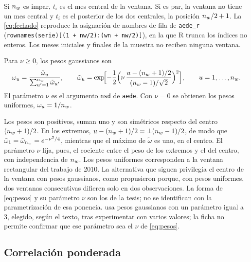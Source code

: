 Si $n_{w}$ es impar, $t_i$ es el mes central de la ventana. Si es par, la ventana no tiene un mes
central y $t_i$ es el posterior de los dos centrales, la posición $n_{w}/2+1$. La
\cref{eq:fechado} reproduce la asignación de nombres de fila de \texttt{aede\_r}
(\texttt{rownames(serie)[(1 + nw/2):(wn + nw/2)]}), en la que R trunca los índices no enteros.
Los meses iniciales y finales de la muestra no reciben ninguna ventana.

\begin{definicion}\label{def:pesos}
Para $\nu\ge0$, los pesos gaussianos son
\begin{equation}\label{eq:pesos}
  \omega_u=\frac{\tilde\omega_u}{\sum_{u'=1}^{n_{w}}\tilde\omega_{u'}},\qquad
  \tilde\omega_u=\exp\!\Bigl[-\frac12\Bigl(\nu\,\frac{u-(n_{w}+1)/2}{(n_{w}-1)/\sqrt2}\Bigr)^{2}\Bigr],
  \qquad u=1,\dots,n_{w} .
\end{equation}
El parámetro $\nu$ es el argumento \texttt{nsd} de \texttt{aede}. Con $\nu=0$ se obtienen los
pesos uniformes, $\omega_u=1/n_{w}$.
\end{definicion}

Los pesos son positivos, suman uno y son simétricos respecto del centro $(n_{w}+1)/2$. En los
extremos, $u-(n_{w}+1)/2=\pm(n_{w}-1)/2$, de modo que $\tilde\omega_1=\tilde\omega_{n_{w}}=e^{-\nu^2/4}$,
mientras que el máximo de $\tilde\omega$ es uno, en el centro. El parámetro $\nu$ fija, pues, el
cociente entre el peso de los extremos y el del centro, con independencia de $n_{w}$. Los pesos
uniformes corresponden a la ventana rectangular del trabajo de 2010. La alternativa que siguen
\textcite{camiz_cerda_atoche_2026} privilegia el centro de la ventana con pesos gaussianos, como
propusieron \textcite{camiz_diblasi_2013} porque, con pesos uniformes, dos ventanas consecutivas difieren solo en dos
observaciones. La forma de \cref{eq:pesos} y su parámetro $\nu$ son los de la tesis; no se
identifican con la parametrización de esa ponencia. \textcite{atoche_murrieta_2022}
usa pesos gaussianos con un parámetro igual a 3, elegido, según el texto, tras experimentar con
varios valores; la ficha no permite confirmar que ese parámetro sea el $\nu$ de \cref{eq:pesos}.

\subsection{Correlación ponderada}

